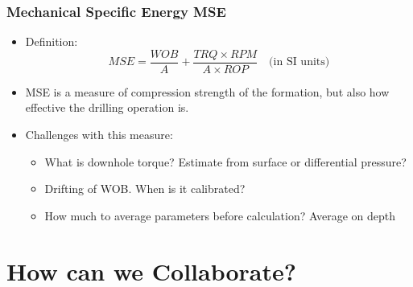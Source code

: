 \documentclass{beamer}
\begin{document}
\begin{frame} \frametitle{Mechanical Specific Energy MSE} 
\vspace{-1cm}

\begin{itemize}
\item<1-> Definition:
\begin{equation*}
MSE = \frac{WOB}{A} + \frac{TRQ \times RPM}{A \times ROP} \quad \mbox{(in SI units)}
\end{equation*}
\item<1-> MSE is a measure of compression strength of the formation, but also how effective the drilling operation is.

\item<2-> Challenges with this measure:
\begin{itemize}
\item<2-> What is downhole torque? Estimate from surface or differential pressure?
\item<2-> Drifting of WOB. When is it calibrated?
\item<2-> How much to average parameters before calculation? Average on depth
\end{itemize}

\end{itemize}

\end{frame}




\section{How can we Collaborate?}
\end{document}
